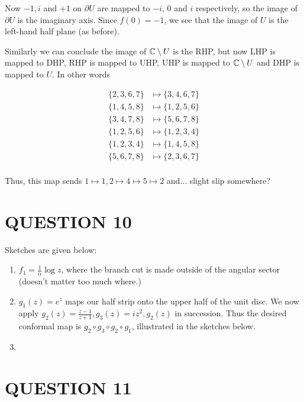 \documentclass[a4paper]{article}
\begin{document}
Now $-1, i$ and $+1$ on $ \partial U $ are mapped to $-i$, $0$ and $i$ respectively, so the image of $\partial U$ is the imaginary axis. Since $f(0) = -1$, we see that the image of $U$ is the left-hand half plane (as before).

Similarly we can conclude the image of $ \mathbb{C} \setminus U $ is the RHP, but now LHP is mapped to DHP, RHP is mapped to UHP, UHP is mapped to $ \mathbb{C} \setminus U $ and DHP is mapped to $ U $. In other words


\begin{align*}
\{2,3,6,7\} & \mapsto \{3,4,6,7  \} \\
\{ 1,4,5,8 \} & \mapsto \{  1,2,5,6 \}\\
\{ 3,4,7,8 \} & \mapsto \{  5,6,7,8 \}\\
\{ 1,2,5,6 \} & \mapsto \{  1,2,3,4 \}\\
\{ 1,2,3,4 \} & \mapsto \{  1,4,5,8 \}\\
\{ 5,6,7,8 \} & \mapsto \{  2,3,6,7 \}\\
\end{align*}

Thus, this map sends $1 \mapsto 1, 2 \mapsto 4 \mapsto 5 \mapsto 2$  and... slight slip somewhere?





\section{QUESTION 10}

Sketches are given below:


\begin{enumerate}
	\item $ f_{1} = \frac{1}{\alpha} \log z $, where the branch cut is made outside of the angular sector (doesn't matter too much where.)
	
	\item $ g_{1}(z) = e^{z} $ maps our half strip onto the upper half of the unit disc. We now apply $ g_{2}(z) = \frac{z-1}{z+1} ,g_{3}(z) =iz^{2} ,g_{2}(z) $ in succession. Thus the desired conformal map is $ g_{2} \circ g_{3} \circ g_{2} \circ g_{1} $, illustrated in the sketches below. 
	
	\item 
\end{enumerate}







\section{QUESTION 11}
\end{document}
